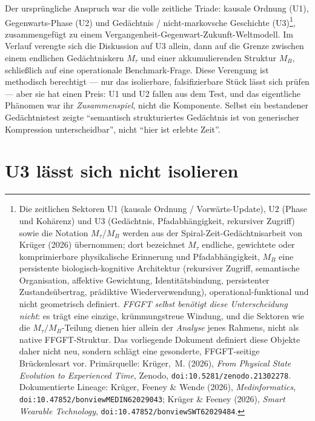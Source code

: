 Der ursprüngliche Anspruch war die volle zeitliche Triade: kausale Ordnung (U1),
Gegenwarts-Phase (U2) und Gedächtnis / nicht-markovsche Geschichte (U3)\footnote{Die zeitlichen Sektoren U1 (kausale Ordnung / Vorwärts-Update), U2 (Phase und Kohärenz) und U3 (Gedächtnis, Pfadabhängigkeit, rekursiver Zugriff) sowie die Notation $M_\tau$/$M_B$ werden aus der Spiral-Zeit-Gedächtnisarbeit von Krüger (2026) übernommen; dort bezeichnet $M_\tau$ endliche, gewichtete oder komprimierbare physikalische Erinnerung und Pfadabhängigkeit, $M_B$ eine persistente biologisch-kognitive Architektur (rekursiver Zugriff, semantische Organisation, affektive Gewichtung, Identitätsbindung, persistenter Zustandsübertrag, prädiktive Wiederverwendung), operational-funktional und nicht geometrisch definiert. \emph{FFGFT selbst benötigt diese Unterscheidung nicht}: es trägt eine einzige, krümmungstreue Windung, und die Sektoren wie die $M_\tau/M_B$-Teilung dienen hier allein der \emph{Analyse} jenes Rahmens, nicht als native FFGFT-Struktur. Das vorliegende Dokument definiert diese Objekte daher nicht neu, sondern schlägt eine gesonderte, FFGFT-seitige Brückenlesart vor. Primärquelle: Krüger,~M. (2026), \emph{From Physical State Evolution to Experienced Time}, Zenodo, \texttt{doi:10.5281/zenodo.21302278}. Dokumentierte Lineage: Krüger, Feeney \& Wende (2026), \emph{Medinformatics}, \texttt{doi:10.47852/bonviewMEDIN62029043}; Krüger \& Feeney (2026), \emph{Smart Wearable Technology}, \texttt{doi:10.47852/bonviewSWT62029484}.}, zusammengefügt zu
einem Vergangenheit-Gegenwart-Zukunft-Weltmodell. Im Verlauf verengte sich die Diskussion
auf U3 allein, dann auf die Grenze zwischen einem endlichen Gedächtniskern $M_\tau$ und
einer akkumulierenden Struktur $M_B$, schließlich auf
eine operationale Benchmark-Frage.
Diese Verengung ist methodisch berechtigt --- nur das isolierbare, falsifizierbare Stück
lässt sich prüfen --- aber sie hat einen Preis: U1 und U2 fallen aus dem Test, und das
eigentliche Phänomen war ihr \emph{Zusammenspiel}, nicht die Komponente. Selbst ein
bestandener Gedächtnistest zeigte \enquote{semantisch strukturiertes Gedächtnis ist von
generischer Kompression unterscheidbar}, nicht \enquote{hier ist erlebte Zeit}.

\section{U3 lässt sich nicht isolieren}

